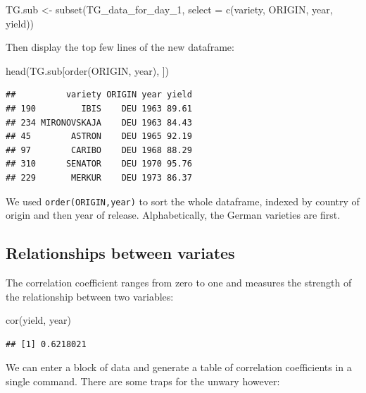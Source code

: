 \documentclass[
]{book}
\newenvironment{Shaded}{\begin{snugshade}}{\end{snugshade}}
\newcommand{\AttributeTok}[1]{\textcolor[rgb]{0.77,0.63,0.00}{#1}}
\newcommand{\FunctionTok}[1]{\textcolor[rgb]{0.00,0.00,0.00}{#1}}
\newcommand{\NormalTok}[1]{#1}
\newcommand{\OtherTok}[1]{\textcolor[rgb]{0.56,0.35,0.01}{#1}}
\begin{document}
\begin{Shaded}
\begin{Highlighting}[]
\NormalTok{TG.sub }\OtherTok{\textless{}{-}} \FunctionTok{subset}\NormalTok{(TG\_data\_for\_day\_1, }\AttributeTok{select =} \FunctionTok{c}\NormalTok{(variety, ORIGIN, }
\NormalTok{    year, yield))}
\end{Highlighting}
\end{Shaded}

Then display the top few lines of the new dataframe:

\begin{Shaded}
\begin{Highlighting}[]
\FunctionTok{head}\NormalTok{(TG.sub[}\FunctionTok{order}\NormalTok{(ORIGIN, year), ])}
\end{Highlighting}
\end{Shaded}

\begin{verbatim}
##          variety ORIGIN year yield
## 190         IBIS    DEU 1963 89.61
## 234 MIRONOVSKAJA    DEU 1963 84.43
## 45        ASTRON    DEU 1965 92.19
## 97        CARIBO    DEU 1968 88.29
## 310      SENATOR    DEU 1970 95.76
## 229       MERKUR    DEU 1973 86.37
\end{verbatim}

We used \texttt{order(ORIGIN,year)} to sort the whole dataframe, indexed by country of origin and then year of release. Alphabetically, the German varieties are first.

\hypertarget{relationships-between-variates}{%
\subsection{Relationships between variates}\label{relationships-between-variates}}

The correlation coefficient ranges from zero to one and measures the strength of the relationship between two variables:

\begin{Shaded}
\begin{Highlighting}[]
\FunctionTok{cor}\NormalTok{(yield, year)}
\end{Highlighting}
\end{Shaded}

\begin{verbatim}
## [1] 0.6218021
\end{verbatim}

We can enter a block of data and generate a table of correlation coefficients in a single command.
There are some traps for the unwary however:
\end{document}
